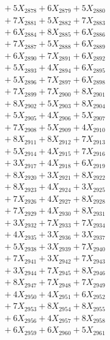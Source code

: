 \documentclass[a4paper,10pt]{article}
\begin{document}
{\begin{align}
&\;  + 5 X_{2878} + 6 X_{2879} + 5 X_{2880} \\[0.3ex]
&\;  + 7 X_{2881} + 5 X_{2882} + 7 X_{2883} \\[0.3ex]
&\;  + 6 X_{2884} + 8 X_{2885} + 6 X_{2886} \\[0.3ex]
&\;  + 7 X_{2887} + 5 X_{2888} + 6 X_{2889} \\[0.5ex]\allowbreak
&\;  + 6 X_{2890} + 7 X_{2891} + 6 X_{2892} \\[0.3ex]
&\;  + 5 X_{2893} + 4 X_{2894} + 6 X_{2895} \\[0.3ex]
&\;  + 5 X_{2896} + 7 X_{2897} + 6 X_{2898} \\[0.3ex]
&\;  + 7 X_{2899} + 7 X_{2900} + 8 X_{2901} \\[0.3ex]
&\;  + 8 X_{2902} + 5 X_{2903} + 8 X_{2904} \\[0.3ex]
&\;  + 5 X_{2905} + 4 X_{2906} + 5 X_{2907} \\[0.3ex]
&\;  + 7 X_{2908} + 5 X_{2909} + 4 X_{2910} \\[0.3ex]
&\;  + 8 X_{2911} + 8 X_{2912} + 7 X_{2913} \\[0.3ex]
&\;  + 5 X_{2914} + 4 X_{2915} + 7 X_{2916} \\[0.3ex]
&\;  + 3 X_{2917} + 4 X_{2918} + 6 X_{2919} \\[0.5ex]\allowbreak
&\;  + 8 X_{2920} + 3 X_{2921} + 8 X_{2922} \\[0.3ex]
&\;  + 8 X_{2923} + 4 X_{2924} + 3 X_{2925} \\[0.3ex]
&\;  + 7 X_{2926} + 4 X_{2927} + 8 X_{2928} \\[0.3ex]
&\;  + 7 X_{2929} + 4 X_{2930} + 8 X_{2931} \\[0.3ex]
&\;  + 3 X_{2932} + 7 X_{2933} + 7 X_{2934} \\[0.3ex]
&\;  + 4 X_{2935} + 3 X_{2936} + 3 X_{2937} \\[0.3ex]
&\;  + 5 X_{2938} + 3 X_{2939} + 7 X_{2940} \\[0.3ex]
&\;  + 7 X_{2941} + 3 X_{2942} + 7 X_{2943} \\[0.3ex]
&\;  + 3 X_{2944} + 7 X_{2945} + 8 X_{2946} \\[0.3ex]
&\;  + 8 X_{2947} + 7 X_{2948} + 7 X_{2949} \\[0.5ex]\allowbreak
&\;  + 4 X_{2950} + 4 X_{2951} + 6 X_{2952} \\[0.3ex]
&\;  + 7 X_{2953} + 8 X_{2954} + 8 X_{2955} \\[0.3ex]
&\;  + 6 X_{2956} + 4 X_{2957} + 8 X_{2958} \\[0.3ex]
&\;  + 6 X_{2959} + 6 X_{2960} + 5 X_{2961} \\[0.3ex]

\end{align}}
\end{document}
